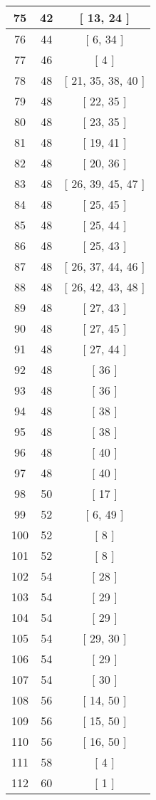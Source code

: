 \begin{center}
\begin{longtable}[H]{|| c c c ||}
75 & 42 & [ 13, 24 ]
\\\hline
76 & 44 & [ 6, 34 ]
\\\hline
77 & 46 & [ 4 ]
\\\hline
78 & 48 & [ 21, 35, 38, 40 ]
\\\hline
79 & 48 & [ 22, 35 ]
\\\hline
80 & 48 & [ 23, 35 ]
\\\hline
81 & 48 & [ 19, 41 ]
\\\hline
82 & 48 & [ 20, 36 ]
\\\hline
83 & 48 & [ 26, 39, 45, 47 ]
\\\hline
84 & 48 & [ 25, 45 ]
\\\hline
85 & 48 & [ 25, 44 ]
\\\hline
86 & 48 & [ 25, 43 ]
\\\hline
87 & 48 & [ 26, 37, 44, 46 ]
\\\hline
88 & 48 & [ 26, 42, 43, 48 ]
\\\hline
89 & 48 & [ 27, 43 ]
\\\hline
90 & 48 & [ 27, 45 ]
\\\hline
91 & 48 & [ 27, 44 ]
\\\hline
92 & 48 & [ 36 ]
\\\hline
93 & 48 & [ 36 ]
\\\hline
94 & 48 & [ 38 ]
\\\hline
95 & 48 & [ 38 ]
\\\hline
96 & 48 & [ 40 ]
\\\hline
97 & 48 & [ 40 ]
\\\hline
98 & 50 & [ 17 ]
\\\hline
99 & 52 & [ 6, 49 ]
\\\hline
100 & 52 & [ 8 ]
\\\hline
101 & 52 & [ 8 ]
\\\hline
102 & 54 & [ 28 ]
\\\hline
103 & 54 & [ 29 ]
\\\hline
104 & 54 & [ 29 ]
\\\hline
105 & 54 & [ 29, 30 ]
\\\hline
106 & 54 & [ 29 ]
\\\hline
107 & 54 & [ 30 ]
\\\hline
108 & 56 & [ 14, 50 ]
\\\hline
109 & 56 & [ 15, 50 ]
\\\hline
110 & 56 & [ 16, 50 ]
\\\hline
111 & 58 & [ 4 ]
\\\hline
112 & 60 & [ 1 ]
\\\hline

\end{longtable}
\end{center}
